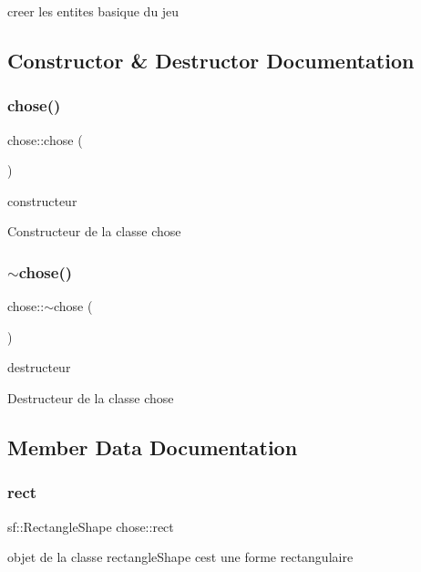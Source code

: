creer les entites basique du jeu 

\subsection{Constructor \& Destructor Documentation}
\mbox{\label{classchose_a2ad5de47a7d345388ea2688f70be0d08}} 
\subsubsection{\texorpdfstring{chose()}{chose()}}
{\footnotesize\ttfamily chose\+::chose (\begin{DoxyParamCaption}{ }\end{DoxyParamCaption})}



constructeur 

Constructeur de la classe chose \mbox{\label{classchose_afd12d56e7a3fb2c4348dc3c436e9346e}} 
\subsubsection{\texorpdfstring{$\sim$chose()}{~chose()}}
{\footnotesize\ttfamily chose\+::$\sim$chose (\begin{DoxyParamCaption}{ }\end{DoxyParamCaption})}



destructeur 

Destructeur de la classe chose 

\subsection{Member Data Documentation}
\mbox{\label{classchose_ac6080789c3df0bd59968cd49c48769e3}} 
\subsubsection{\texorpdfstring{rect}{rect}}
{\footnotesize\ttfamily sf\+::\+Rectangle\+Shape chose\+::rect}

objet de la classe rectangle\+Shape c\textquotesingle{}est une forme rectangulaire \mbox{\label{classchose_a9586c23eb5c1c72eac854690a1309c11}} 
